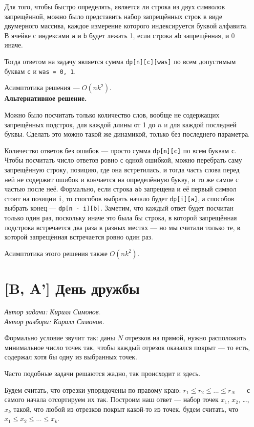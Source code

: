 \documentclass[12pt]{article}
\theoremstyle{definition}
\begin{document}
Для того, чтобы быстро определять, является ли строка из двух символов запрещённой, можно было представить набор запрещённых строк в виде двумерного массива, каждое измерение которого индексируется буквой алфавита. В ячейке с индексами \verb|a| и
\verb|b| будет лежать 1, если строка \verb|ab| запрещённая, и 0 иначе.

Тогда ответом на задачу является сумма \verb|dp[n][c][was]| по всем допустимым буквам \verb|c| и \verb|was = 0, 1|.

Асимптотика решения --- $O(nk^2)$. \\

\textbf{Альтернативное решение.}

Можно было посчитать только количество слов, вообще не содержащих запрещённых подстрок, для каждой длины от 1 до $n$ и для каждой последней буквы.
Сделать это можно такой же динамикой, только без последнего параметра.

Количество ответов без ошибок --- просто сумма \verb|dp[n][c]| по всем буквам \verb|c|.
Чтобы посчитать число ответов ровно с одной ошибкой, можно перебрать саму запрещённую строку, позицию, где она встретилась, и тогда часть слова перед ней не содержит ошибок и кончается на определённую букву, и то же самое с частью после неё. Формально, если строка \verb|ab| запрещена и её первый символ стоит на позиции \verb|i|, то
способов выбрать начало будет \verb|dp[i][a]|, а способов выбрать конец --- \verb|dp[n - i][b]|. Заметим, что каждый ответ будет посчитан только один раз, поскольку иначе это была бы строка, в которой запрещённая подстрока встречается два раза в разных местах --- но мы считали только те, в которой запрещённая встречается ровно один раз.

Асимптотика этого решения также $O(nk^2)$.

\section{[B, A'] День дружбы}
\textit{Автор задачи: Кирилл Симонов.} \\
\textit{Автор разбора: Кирилл Симонов.}

Формально условие звучит так: даны $N$ отрезков на прямой, нужно расположить минимальное число точек так, чтобы каждый отрезок оказался покрыт --- то есть, содержал хотя бы одну из выбранных точек.

Часто подобные задачи решаются жадно, так происходит и здесь.

Будем считать, что отрезки упорядочены по правому краю: $r_1 \le r_2 \le \dots \le r_N$ --- с самого начала отсортируем их так. Построим наш ответ --- набор точек $x_1$, $x_2$, \dots, $x_k$ такой, что любой из отрезков покрыт какой-то из точек, будем считать, что $x_1 \le x_2 \le \dots \le x_k$.
\end{document}
